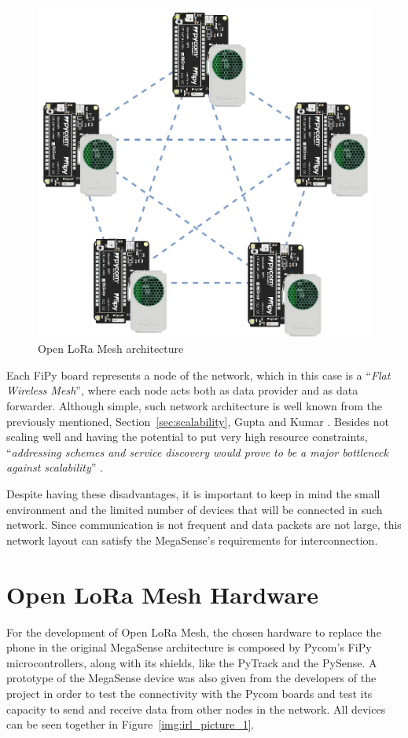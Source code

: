 		\begin{figure}[h]
			\centering
			\includegraphics[width=.7\textwidth]{resources/img/chap5/mesh-architecture-1}
			\caption{Open LoRa Mesh architecture}
			\label{img:openmesh_architecture}
		\end{figure}
		
		Each FiPy board represents a node of the network, which in this case is a ``\textit{Flat Wireless Mesh}'', where each node acts both as data provider and as data forwarder.
		Although simple, such network architecture is well known from the previously mentioned, Section~\ref{sec:scalability}, Gupta and Kumar \cite{825799}.
		Besides not scaling well and having the potential to put very high resource constraints, ``\textit{addressing schemes and service discovery would prove to be a major bottleneck against scalability}'' \cite{92000412}.
		
		Despite having these disadvantages, it is important to keep in mind the small environment and the limited number of devices that will be connected in such network.
		Since communication is not frequent and data packets are not large, this network layout can satisfy the MegaSense's requirements for interconnection.

	\section{Open LoRa Mesh Hardware}\label{sec:hardware_solution}
	
		For the development of Open LoRa Mesh, the chosen hardware to replace the phone in the original MegaSense architecture is composed by Pycom's FiPy microcontrollers, along with its shields, like the PyTrack and the PySense.
		A prototype of the MegaSense device was also given from the developers of the project in order to test the connectivity with the Pycom boards and test its capacity to send and receive data from other nodes in the network.
		All devices can be seen together in Figure~\ref{img:irl_picture_1}.
		
